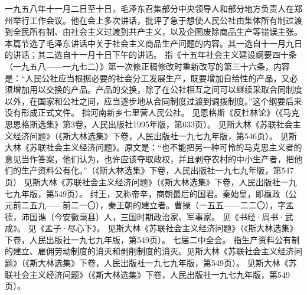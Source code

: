 \begin{maonote}
一九五八年十一月二日至十日，毛泽东召集部分中央领导人和部分地方负责人在郑州举行工作会议。他在会上多次讲话，批评了急于想使人民公社由集体所有制过渡到全民所有制、由社会主义过渡到共产主义，以及企图废除商品生产等错误主张。本篇节选了毛泽东讲话中关于社会主义商品生产问题的内容。其一选自十一月九日的讲话；其二选自十一月十日下午的讲话。
指《十五年社会主义建设纲要四十条（一九五八——一九七二）》第一次修正稿修改时重新改写的第三十六条，内容是：“人民公社应当根据必要的社会分工发展生产，既要增加自给性的产品，又必须增加用以交换的产品。产品的交换，除了在公社相互之间可以继续采取合同制度以外，在国家和公社之间，应当逐步地从合同制度过渡到调拨制度。”这个纲要后来没有形成正式文件。
指河南新乡七里营人民公社。
见恩格斯《反杜林论》（《马克思恩格斯选集》第3卷，人民出版社1995年版，第633页）。
见斯大林《苏联社会主义经济问题》（《斯大林选集》下卷，人民出版社一九七九年版，第546页）。
见斯大林《苏联社会主义经济问题》。原文是：“也不能把另一种可怜的马克思主义者的意见当作答案，他们认为，也许应该夺取政权，并且剥夺农村的中小生产者，把他们的生产资料公有化。”（《斯大林选集》下卷，人民出版社一九七九年版，第547页）
见斯大林《苏联社会主义经济问题》（《斯大林选集》下卷，人民出版社一九七九年版，第549页）。
纣王，又称帝辛，商朝最后的国君。秦始皇，即嬴政（公元前二五九——前二一〇），秦王朝的建立者。曹操（一五五——二二〇），字孟德，沛国谯（今安徽毫县）人，三国时期政治家、军事家。
见《书经·周书·武成》。
见《孟子·尽心下》。
见斯大林《苏联社会主义经济问题》（《斯大林选集》下卷，人民出版社一九七九年版，第549页）。
七届二中全会。
指生产资料公有制的建立、雇佣劳动制度的消灭和剥削制度的消灭。见斯大林《苏联社会主义经济问题》（《斯大林选集》下卷，人民出版社一九七九年版，第549页）。
见斯大林《苏联社会主义经济问题》（《斯大林选集》下卷，人民出版社一九七九年版，第549页）。
\end{maonote}
